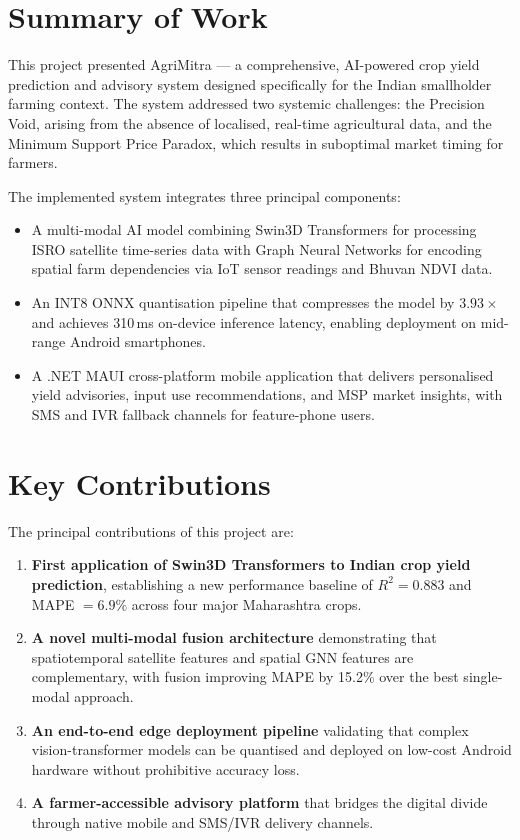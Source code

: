 \section{Summary of Work}

This project presented AgriMitra --- a comprehensive, AI-powered crop yield prediction and advisory system designed specifically for the Indian smallholder farming context. The system addressed two systemic challenges: the Precision Void, arising from the absence of localised, real-time agricultural data, and the Minimum Support Price Paradox, which results in suboptimal market timing for farmers.

The implemented system integrates three principal components:
\begin{itemize}
    \item A multi-modal AI model combining Swin3D Transformers for processing ISRO satellite time-series data with Graph Neural Networks for encoding spatial farm dependencies via IoT sensor readings and Bhuvan NDVI data.
    \item An INT8 ONNX quantisation pipeline that compresses the model by $3.93\times$ and achieves 310\,ms on-device inference latency, enabling deployment on mid-range Android smartphones.
    \item A .NET MAUI cross-platform mobile application that delivers personalised yield advisories, input use recommendations, and MSP market insights, with SMS and IVR fallback channels for feature-phone users.
\end{itemize}

\section{Key Contributions}

The principal contributions of this project are:
\begin{enumerate}
    \item \textbf{First application of Swin3D Transformers to Indian crop yield prediction}, establishing a new performance baseline of $R^2 = 0.883$ and MAPE $= 6.9\%$ across four major Maharashtra crops.
    \item \textbf{A novel multi-modal fusion architecture} demonstrating that spatiotemporal satellite features and spatial GNN features are complementary, with fusion improving MAPE by 15.2\% over the best single-modal approach.
    \item \textbf{An end-to-end edge deployment pipeline} validating that complex vision-transformer models can be quantised and deployed on low-cost Android hardware without prohibitive accuracy loss.
    \item \textbf{A farmer-accessible advisory platform} that bridges the digital divide through native mobile and SMS/IVR delivery channels.
\end{enumerate}

